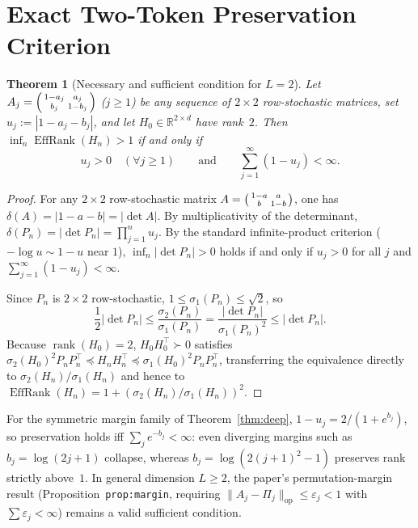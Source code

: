 \documentclass[11pt]{article}
\theoremstyle{plain}
\newtheorem{theorem}{Theorem}
\theoremstyle{definition}
\theoremstyle{remark}
\DeclareMathOperator{\EffRank}{EffRank}
\DeclareMathOperator{\rank}{rank}
\begin{document}
\section{Exact Two-Token Preservation Criterion}

\begin{theorem}[Necessary and sufficient condition for $L = 2$]\label{thm:iff}
Let $A_j = \begin{psmallmatrix}1 - a_j & a_j \\ b_j & 1 - b_j\end{psmallmatrix}$ ($j \ge 1$) be any sequence of $2 \times 2$ row-stochastic matrices, set $u_j := |1 - a_j - b_j|$, and let $H_0 \in \mathbb{R}^{2 \times d}$ have rank~$2$. Then $\inf_n \EffRank(H_n) > 1$ if and only if
\[
u_j > 0 \quad (\forall j \ge 1) \qquad \text{and} \qquad \sum_{j=1}^\infty (1 - u_j) < \infty.
\]
\end{theorem}

\begin{proof}
For any $2 \times 2$ row-stochastic matrix $A = \begin{psmallmatrix}1-a & a \\ b & 1-b\end{psmallmatrix}$, one has $\delta(A) = |1 - a - b| = |\det A|$. By multiplicativity of the determinant, $\delta(P_n) = |\det P_n| = \prod_{j=1}^n u_j$. By the standard infinite-product criterion ($-\log u \sim 1 - u$ near $1$), $\inf_n |\det P_n| > 0$ holds if and only if $u_j > 0$ for all $j$ and $\sum_{j=1}^\infty (1 - u_j) < \infty$.

Since $P_n$ is $2 \times 2$ row-stochastic, $1 \le \sigma_1(P_n) \le \sqrt{2}$, so
\[
\frac{1}{2}|\det P_n| \le \frac{\sigma_2(P_n)}{\sigma_1(P_n)} = \frac{|\det P_n|}{\sigma_1(P_n)^2} \le |\det P_n|.
\]
Because $\rank(H_0) = 2$, $H_0 H_0^\top \succ 0$ satisfies $\sigma_2(H_0)^2 P_n P_n^\top \preceq H_n H_n^\top \preceq \sigma_1(H_0)^2 P_n P_n^\top$, transferring the equivalence directly to $\sigma_2(H_n)/\sigma_1(H_n)$ and hence to $\EffRank(H_n) = 1 + (\sigma_2(H_n)/\sigma_1(H_n))^2$.
\end{proof}

For the symmetric margin family of Theorem~\ref{thm:deep}, $1 - u_j = 2/(1 + e^{b_j})$, so preservation holds iff $\sum_j e^{-b_j} < \infty$: even diverging margins such as $b_j = \log(2j+1)$ collapse, whereas $b_j = \log(2(j+1)^2 - 1)$ preserves rank strictly above~$1$.
In general dimension $L \ge 2$, the paper's permutation-margin result (Proposition~\texttt{prop:margin}, requiring $\|A_j - \Pi_j\|_{\mathrm{op}} \le \varepsilon_j < 1$ with $\sum \varepsilon_j < \infty$) remains a valid sufficient condition.
\end{document}

